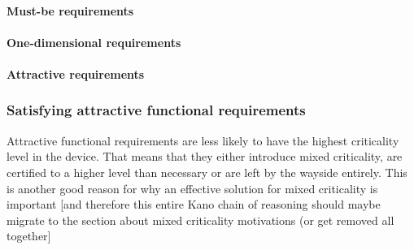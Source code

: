 \paragraph{Must-be requirements}  \autocite{ElmarSauerwein.1996}

\paragraph{One-dimensional requirements} \autocite{ElmarSauerwein.1996}

\paragraph{Attractive requirements} \autocite{ElmarSauerwein.1996}

\begin{comment}
In projects that consist purely of software, customer dissatisfaction is the only negative factor. Projects that also require custom hardware have an additional cost. The hardware already needs to implement every functionality and all manufactured devices need to support it. If the feature is then not implemented the hardware costs more without offering the benefits.
\end{comment}

\subsubsection{Satisfying attractive functional requirements}
Attractive functional requirements are less likely to have the highest criticality level in the device. That means that they either introduce mixed criticality, are certified to a higher level than necessary or are left by the wayside entirely. This is another good reason for why an effective solution for mixed criticality is important [and therefore this entire Kano chain of reasoning should maybe migrate to the section about mixed criticality motivations (or get removed all together]
